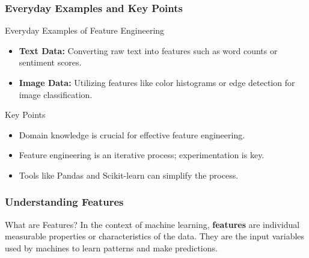 \documentclass[aspectratio=169]{beamer}
\begin{document}
\begin{frame}[fragile]
    \frametitle{Everyday Examples and Key Points}
    \begin{block}{Everyday Examples of Feature Engineering}
        \begin{itemize}
            \item \textbf{Text Data:} Converting raw text into features such as word counts or sentiment scores.
            \item \textbf{Image Data:} Utilizing features like color histograms or edge detection for image classification.
        \end{itemize}
    \end{block}
    \begin{block}{Key Points}
        \begin{itemize}
            \item Domain knowledge is crucial for effective feature engineering.
            \item Feature engineering is an iterative process; experimentation is key.
            \item Tools like Pandas and Scikit-learn can simplify the process.
        \end{itemize}
    \end{block}
\end{frame}

\begin{frame}[fragile]
    \frametitle{Understanding Features}
    \begin{block}{What are Features?}
        In the context of machine learning, \textbf{features} are individual measurable properties or characteristics of the data. They are the input variables used by machines to learn patterns and make predictions.
    \end{block}
\end{frame}
\end{document}
